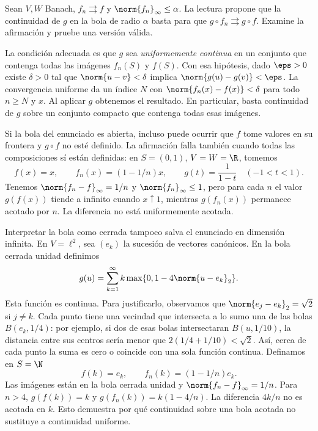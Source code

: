 \begin{ejercicio}
Sean $V,W$ Banach, $f_n\rightrightarrows f$ y $\norm{f_n}_\infty\le\alpha$. La lectura propone que la continuidad de $g$ en la bola de radio $\alpha$ basta para que $g\circ f_n\rightrightarrows g\circ f$. Examine la afirmación y pruebe una versión válida.
\end{ejercicio}
\begin{solucion}
La condición adecuada es que $g$ sea \emph{uniformemente continua} en un conjunto que contenga todas las imágenes $f_n(S)$ y $f(S)$. Con esa hipótesis, dado $\eps>0$ existe $\delta>0$ tal que
$\norm{u-v}<\delta$ implica $\norm{g(u)-g(v)}<\eps$. La convergencia uniforme da un índice $N$ con $\norm{f_n(x)-f(x)}<\delta$ para todo $n\ge N$ y $x$. Al aplicar $g$ obtenemos el resultado. En particular, basta continuidad de $g$ sobre un conjunto compacto que contenga todas esas imágenes.

Si la bola del enunciado es abierta, incluso puede ocurrir que $f$ tome valores en su frontera y $g\circ f$ no esté definido. La afirmación falla también cuando todas las composiciones sí están definidas: en $S=(0,1)$, $V=W=\R$, tomemos
\[
 f(x)=x,\qquad f_n(x)=(1-1/n)x,\qquad g(t)=\frac1{1-t}\quad(-1<t<1).
\]
Tenemos $\norm{f_n-f}_\infty=1/n$ y $\norm{f_n}_\infty\le1$, pero para cada $n$ el valor $g(f(x))$ tiende a infinito cuando $x\uparrow1$, mientras $g(f_n(x))$ permanece acotado por $n$. La diferencia no está uniformemente acotada.

Interpretar la bola como cerrada tampoco salva el enunciado en dimensión infinita. En $V=\ell^2$, sea $(e_k)$ la sucesión de vectores canónicos. En la bola cerrada unidad definimos
\[
 g(u)=\sum_{k=1}^\infty k\max\{0,1-4\norm{u-e_k}_2\}.
\]
Esta función es continua. Para justificarlo, observamos que $\norm{e_j-e_k}_2=\sqrt2$ si $j\ne k$. Cada punto tiene una vecindad que intersecta a lo sumo una de las bolas $B(e_k,1/4)$: por ejemplo, si dos de esas bolas intersectaran $B(u,1/10)$, la distancia entre sus centros sería menor que $2(1/4+1/10)<\sqrt2$. Así, cerca de cada punto la suma es cero o coincide con una sola función continua. Definamos en $S=\N$
\[
 f(k)=e_k,\qquad f_n(k)=(1-1/n)e_k.
\]
Las imágenes están en la bola cerrada unidad y $\norm{f_n-f}_\infty=1/n$. Para $n>4$, $g(f(k))=k$ y $g(f_n(k))=k(1-4/n)$. La diferencia $4k/n$ no es acotada en $k$. Esto demuestra por qué continuidad sobre una bola acotada no sustituye a continuidad uniforme.
\end{solucion}

